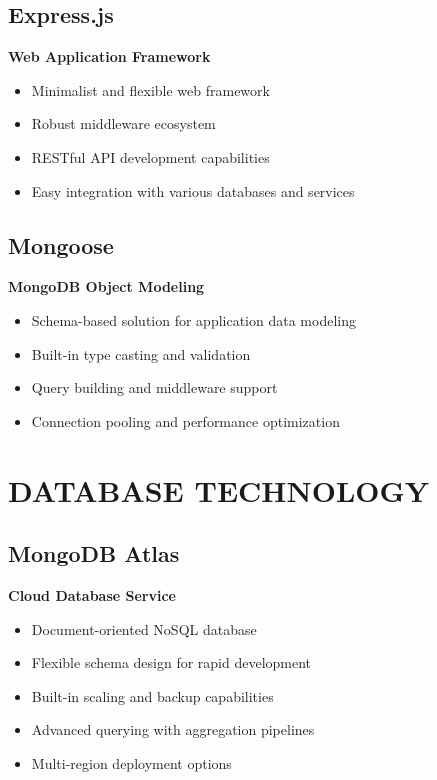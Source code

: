 \subsection{Express.js}

\textbf{Web Application Framework}

\begin{itemize}
\item Minimalist and flexible web framework
\item Robust middleware ecosystem
\item RESTful API development capabilities
\item Easy integration with various databases and services
\end{itemize}

\subsection{Mongoose}

\textbf{MongoDB Object Modeling}

\begin{itemize}
\item Schema-based solution for application data modeling
\item Built-in type casting and validation
\item Query building and middleware support
\item Connection pooling and performance optimization
\end{itemize}

\section{DATABASE TECHNOLOGY}

\subsection{MongoDB Atlas}

\textbf{Cloud Database Service}

\begin{itemize}
\item Document-oriented NoSQL database
\item Flexible schema design for rapid development
\item Built-in scaling and backup capabilities
\item Advanced querying with aggregation pipelines
\item Multi-region deployment options
\end{itemize}

